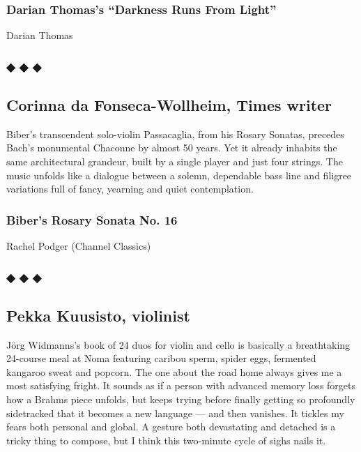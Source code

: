 \hypertarget{darian-thomass-darkness-runs-from-light}{%
\subsubsection{Darian Thomas's ``Darkness Runs From
Light''}\label{darian-thomass-darkness-runs-from-light}}

Darian Thomas

\hypertarget{---5}{%
\subsubsection{◆ ◆ ◆}\label{---5}}

\hypertarget{corinna-da-fonseca-wollheim-times-writer}{%
\subsection{Corinna da Fonseca-Wollheim, Times
writer}\label{corinna-da-fonseca-wollheim-times-writer}}

Biber's transcendent solo-violin Passacaglia, from his Rosary Sonatas,
precedes Bach's monumental Chaconne by almost 50 years. Yet it already
inhabits the same architectural grandeur, built by a single player and
just four strings. The music unfolds like a dialogue between a solemn,
dependable bass line and filigree variations full of fancy, yearning and
quiet contemplation.

\hypertarget{bibers-rosary-sonata-no-16}{%
\subsubsection{Biber's Rosary Sonata No.
16}\label{bibers-rosary-sonata-no-16}}

Rachel Podger (Channel Classics)

\hypertarget{---6}{%
\subsubsection{◆ ◆ ◆}\label{---6}}

\hypertarget{pekka-kuusisto-violinist}{%
\subsection{Pekka Kuusisto, violinist}\label{pekka-kuusisto-violinist}}

Jörg Widmanns's book of 24 duos for violin and cello is basically a
breathtaking 24-course meal at Noma featuring caribou sperm, spider
eggs, fermented kangaroo sweat and popcorn. The one about the road home
always gives me a most satisfying fright. It sounds as if a person with
advanced memory loss forgets how a Brahms piece unfolds, but keeps
trying before finally getting so profoundly sidetracked that it becomes
a new language --- and then vanishes. It tickles my fears both personal
and global. A gesture both devastating and detached is a tricky thing to
compose, but I think this two-minute cycle of sighs nails it.

